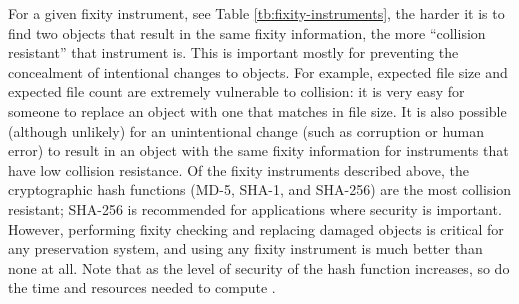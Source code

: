 \documentclass[final]{vutinfth}
\providecommand{\DIFaddbegin}{} %
\begin{document}
For a given fixity instrument, see Table \ref{tb:fixity-instruments}, the harder it is to find two objects that result in the same fixity information, the more “collision resistant” that instrument is. This is important mostly for preventing the concealment of intentional changes to objects. For example, expected file size and expected file count are extremely vulnerable to collision: it is very easy for someone to replace an object with one that matches in file size. It is also possible (although unlikely) for an unintentional change (such as corruption or human error) to result in an object with the same fixity information for instruments that have low collision resistance. Of the fixity instruments described above, the cryptographic hash functions (MD-5, SHA-1, and SHA-256) are the most collision resistant; SHA-256 is recommended for applications where security is important. However, performing fixity checking and replacing damaged objects is critical for any preservation system, and using any fixity instrument is much better than none at all. Note that as the level of security of the hash function increases, so do the time and resources needed to compute \cite[7]{ndsa2014fixity}.
\DIFaddbegin 
\end{document}
